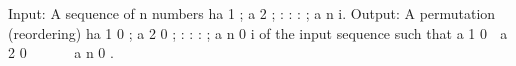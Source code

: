 Input: A sequence of n numbers ha 1 ; a 2 ; : : : ; a n i.
Output: A permutation (reordering) ha 1 0 ; a 2 0 ; : : : ; a n 0 i of the input sequence such
that a 1 0  a 2 0      a n 0 .